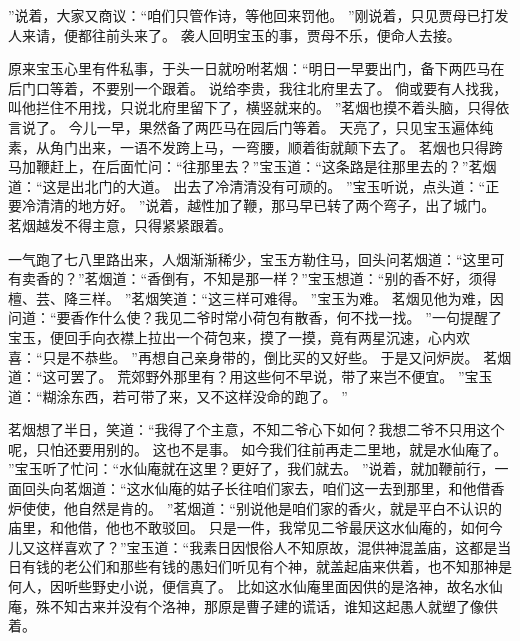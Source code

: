”说着，大家又商议：“咱们只管作诗，等他回来罚他。
”刚说着，只见贾母已打发人来请，便都往前头来了。
袭人回明宝玉的事，贾母不乐，便命人去接。
\par
原来宝玉心里有件私事，于头一日就吩咐茗烟：“明日一早要出门，备下两匹马在后门口等着，不要别一个跟着。
说给李贵，我往北府里去了。
倘或要有人找我，叫他拦住不用找，只说北府里留下了，横竖就来的。
”茗烟也摸不着头脑，只得依言说了。
今儿一早，果然备了两匹马在园后门等着。
天亮了，只见宝玉遍体纯素，从角门出来，一语不发跨上马，一弯腰，顺着街就颠下去了。
茗烟也只得跨马加鞭赶上，在后面忙问：“往那里去？”宝玉道：“这条路是往那里去的？”茗烟道：“这是出北门的大道。
出去了冷清清没有可顽的。
”宝玉听说，点头道：“正要冷清清的地方好。
”说着，越性加了鞭，那马早已转了两个弯子，出了城门。
茗烟越发不得主意，只得紧紧跟着。
\par
一气跑了七八里路出来，人烟渐渐稀少，宝玉方勒住马，回头问茗烟道：“这里可有卖香的？”茗烟道：“香倒有，不知是那一样？”宝玉想道：“别的香不好，须得檀、芸、降三样。
”茗烟笑道：“这三样可难得。
”宝玉为难。
茗烟见他为难，因问道：“要香作什么使？我见二爷时常小荷包有散香，何不找一找。
”一句提醒了宝玉，便回手向衣襟上拉出一个荷包来，摸了一摸，竟有两星沉速，心内欢喜：“只是不恭些。
”再想自己亲身带的，倒比买的又好些。
于是又问炉炭。
茗烟道：“这可罢了。
荒郊野外那里有？用这些何不早说，带了来岂不便宜。
”宝玉道：“糊涂东西，若可带了来，又不这样没命的跑了。
”\par
茗烟想了半日，笑道：“我得了个主意，不知二爷心下如何？我想二爷不只用这个呢，只怕还要用别的。
这也不是事。
如今我们往前再走二里地，就是水仙庵了。
”宝玉听了忙问：“水仙庵就在这里？更好了，我们就去。
”说着，就加鞭前行，一面回头向茗烟道：“这水仙庵的姑子长往咱们家去，咱们这一去到那里，和他借香炉使使，他自然是肯的。
”茗烟道：“别说他是咱们家的香火，就是平白不认识的庙里，和他借，他也不敢驳回。
只是一件，我常见二爷最厌这水仙庵的，如何今儿又这样喜欢了？”宝玉道：“我素日因恨俗人不知原故，混供神混盖庙，这都是当日有钱的老公们和那些有钱的愚妇们听见有个神，就盖起庙来供着，也不知那神是何人，因听些野史小说，便信真了。
比如这水仙庵里面因供的是洛神，故名水仙庵，殊不知古来并没有个洛神，那原是曹子建的谎话，谁知这起愚人就塑了像供着。
